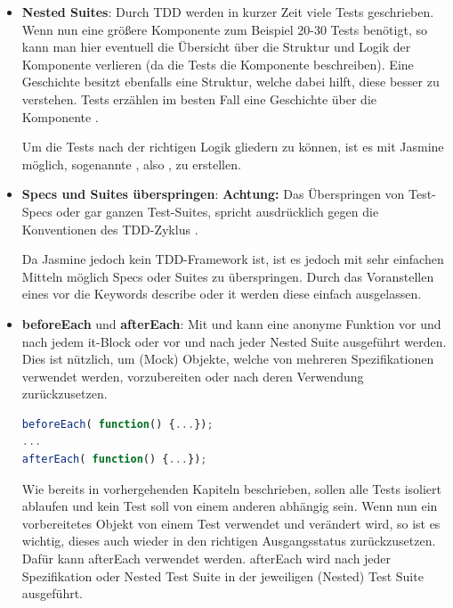 \begin{itemize}
  \item \textbf{Nested Suites}: \newline
  Durch TDD werden in kurzer Zeit viele Tests geschrieben. Wenn nun eine größere Komponente zum Beispiel 20-30 Tests benötigt, so kann man hier eventuell die Übersicht über die Struktur und Logik der Komponente verlieren (da die Tests die Komponente beschreiben). Eine Geschichte besitzt ebenfalls eine Struktur, welche dabei hilft, diese besser zu verstehen. Tests erzählen im besten Fall eine Geschichte über die Komponente \autocite[11]{Beck:2003}.

  Um die Tests nach der richtigen Logik gliedern zu können, ist es mit Jasmine möglich, sogenannte , also , zu erstellen.

  \item \textbf{Specs und Suites überspringen}: \newline
  \textbf{Achtung:} Das Überspringen von Test-Specs oder gar ganzen Test-Suites, spricht ausdrücklich gegen die Konventionen des TDD-Zyklus \autocite{Beck:2003}.

  Da Jasmine jedoch kein TDD-Framework ist, ist es jedoch mit sehr einfachen Mitteln möglich Specs oder Suites zu überspringen. Durch das Voranstellen eines  vor die Keywords describe oder it werden diese einfach ausgelassen.

  \item \textbf{beforeEach} und \textbf{afterEach}: \newline
  Mit  und  kann eine anonyme Funktion vor und nach jedem it-Block oder vor und nach jeder Nested Suite ausgeführt werden. Dies ist nützlich, um (Mock) Objekte, welche von mehreren Spezifikationen verwendet werden, vorzubereiten oder nach deren Verwendung zurückzusetzen.

  \begin{lstlisting}[language=JavaScript]
beforeEach( function() {...});
...
afterEach( function() {...});

  \end{lstlisting}

  Wie bereits in vorhergehenden Kapiteln beschrieben, sollen alle Tests isoliert ablaufen und kein Test soll von einem anderen abhängig sein. Wenn nun ein vorbereitetes Objekt von einem Test verwendet und verändert wird, so ist es wichtig, dieses auch wieder in den richtigen Ausgangsstatus zurückzusetzen. Dafür kann afterEach verwendet werden. afterEach wird nach jeder Spezifikation oder Nested Test Suite in der jeweiligen (Nested) Test Suite ausgeführt.

\end{itemize}

